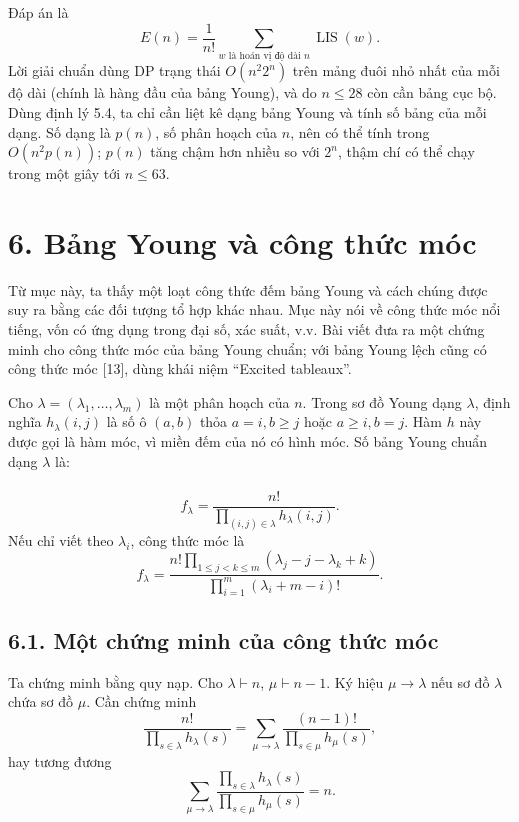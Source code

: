 \documentclass[11pt]{article}
\begin{document}
Đáp án là
\[
E(n)=\frac1{n!}\sum_{w\text{ là hoán vị độ dài }n}\operatorname{LIS}(w).
\]
Lời giải chuẩn dùng DP trạng thái \(O(n^2 2^n)\) trên mảng đuôi nhỏ nhất của
mỗi độ dài (chính là hàng đầu của bảng Young), và do \(n\le28\) còn cần bảng
cục bộ. Dùng định lý 5.4, ta chỉ cần liệt kê dạng bảng Young và tính số bảng
của mỗi dạng. Số dạng là \(p(n)\), số phân hoạch của \(n\), nên có thể tính
trong \(O(n^2p(n))\); \(p(n)\) tăng chậm hơn nhiều so với \(2^n\), thậm chí
có thể chạy trong một giây tới \(n\le63\).

\section*{6. Bảng Young và công thức móc}

Từ mục này, ta thấy một loạt công thức đếm bảng Young và cách chúng được suy
ra bằng các đối tượng tổ hợp khác nhau. Mục này nói về công thức móc nổi
tiếng, vốn có ứng dụng trong đại số, xác suất, v.v. Bài viết đưa ra một
chứng minh cho công thức móc của bảng Young chuẩn; với bảng Young lệch cũng
có công thức móc [13], dùng khái niệm ``Excited tableaux''.

Cho \(\lambda=(\lambda_1,\ldots,\lambda_m)\) là một phân hoạch của \(n\).
Trong sơ đồ Young dạng \(\lambda\), định nghĩa \(h_\lambda(i,j)\) là số ô
\((a,b)\) thỏa \(a=i,b\ge j\) hoặc \(a\ge i,b=j\). Hàm \(h\) này được gọi là
hàm móc, vì miền đếm của nó có hình móc. Số bảng Young chuẩn dạng \(\lambda\)
là:

\paragraph{}
\[
f_\lambda=\frac{n!}{\prod_{(i,j)\in\lambda} h_\lambda(i,j)}.
\tag{39}
\]
Nếu chỉ viết theo \(\lambda_i\), công thức móc là
\[
f_\lambda=
\frac{
n!\prod_{1\le j<k\le m}(\lambda_j-j-\lambda_k+k)}
{\prod_{i=1}^m(\lambda_i+m-i)!}.
\]

\subsection*{6.1. Một chứng minh của công thức móc}

Ta chứng minh bằng quy nạp. Cho \(\lambda\vdash n\), \(\mu\vdash n-1\). Ký
hiệu \(\mu\to\lambda\) nếu sơ đồ \(\lambda\) chứa sơ đồ \(\mu\). Cần chứng
minh
\[
\frac{n!}{\prod_{s\in\lambda}h_\lambda(s)}
=\sum_{\mu\to\lambda}
\frac{(n-1)!}{\prod_{s\in\mu}h_\mu(s)},
\]
hay tương đương
\[
\sum_{\mu\to\lambda}
\frac{\prod_{s\in\lambda}h_\lambda(s)}
{\prod_{s\in\mu}h_\mu(s)}=n.
\tag{40}
\]
\end{document}

